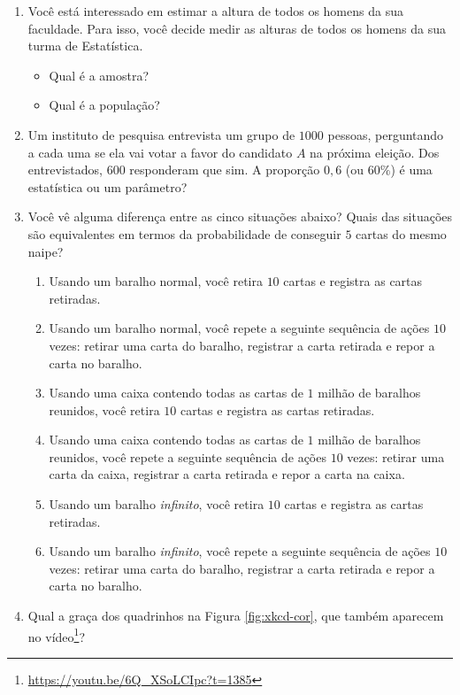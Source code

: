 \documentclass[
  12pt]{report}
\DeclareRobustCommand{\href}[2]{#2\footnote{\url{#1}}}
\providecommand{\tightlist}{%
  \setlength{\itemsep}{0pt}\setlength{\parskip}{0pt}}
\begin{document}
\begin{enumerate}
\def\labelenumi{\arabic{enumi}.}
\item
  Você está interessado em estimar a altura de todos os homens da sua faculdade. Para isso, você decide medir as alturas de todos os homens da sua turma de Estatística.

  \begin{itemize}
  \tightlist
  \item
    Qual é a amostra?
  \item
    Qual é a população?
  \end{itemize}
\item
  Um instituto de pesquisa entrevista um grupo de \(1000\) pessoas, perguntando a cada uma se ela vai votar a favor do candidato \(A\) na próxima eleição. Dos entrevistados, \(600\) responderam que sim. A proporção \(0{,}6\) (ou \(60\%\)) é uma estatística ou um parâmetro?
\item
  Você vê alguma diferença entre as cinco situações abaixo? Quais das situações são equivalentes em termos da probabilidade de conseguir \(5\) cartas do mesmo naipe?

  \begin{enumerate}
  \def\labelenumii{\alph{enumii}.}
  \item
    Usando um baralho normal, você retira \(10\) cartas e registra as cartas retiradas.
  \item
    Usando um baralho normal, você repete a seguinte sequência de ações \(10\) vezes: retirar uma carta do baralho, registrar a carta retirada e repor a carta no baralho.
  \item
    Usando uma caixa contendo todas as cartas de \(1\) milhão de baralhos reunidos, você retira \(10\) cartas e registra as cartas retiradas.
  \item
    Usando uma caixa contendo todas as cartas de \(1\) milhão de baralhos reunidos, você repete a seguinte sequência de ações \(10\) vezes: retirar uma carta da caixa, registrar a carta retirada e repor a carta na caixa.
  \item
    Usando um baralho \emph{infinito}, você retira \(10\) cartas e registra as cartas retiradas.
  \item
    Usando um baralho \emph{infinito}, você repete a seguinte sequência de ações \(10\) vezes: retirar uma carta do baralho, registrar a carta retirada e repor a carta no baralho.
  \end{enumerate}
\item
  Qual a graça dos quadrinhos na Figura \ref{fig:xkcd-cor}, que também \href{https://youtu.be/6Q_XSoLCIpc?t=1385}{aparecem no vídeo}?


\end{enumerate}
\end{document}
